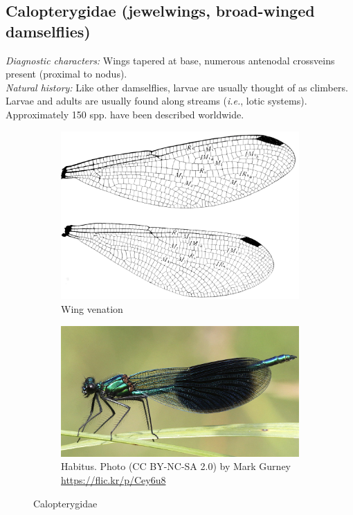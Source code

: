\documentclass[letterpaper, 11pt]{article}
\begin{document}
\subsection{Calopterygidae (jewelwings, broad-winged damselflies)}
\noindent{}\textit{Diagnostic characters:} Wings tapered at base, numerous antenodal crossveins present (proximal to nodus).\\

\noindent{}\textit{Natural history:} Like other damselflies, larvae are usually thought of as climbers. Larvae and adults are usually found along streams (\textit{i.e.}, lotic systems). Approximately 150 spp. have been described worldwide.\\

\begin{figure}[ht!]
    \centering
    \begin{subfigure}[ht!]{0.45\textwidth}
        \includegraphics[width=\textwidth]{CalopterygidWing}
        \caption{Wing venation \citep[][Fig. 235]{comstock1918wings}}
        \label{fig:calopwing}
    \end{subfigure}
    \hfill
    \begin{subfigure}[ht!]{0.45\textwidth}
        \includegraphics[width=\textwidth]{CalopterygidHabitus}
        \caption{Habitus. Photo (CC BY-NC-SA 2.0) by Mark Gurney \url{https://flic.kr/p/Cey6u8}}
        \label{fig:calopbody}
    \end{subfigure}
    \caption{Calopterygidae}\label{fig:calop}
\end{figure}
\end{document}

